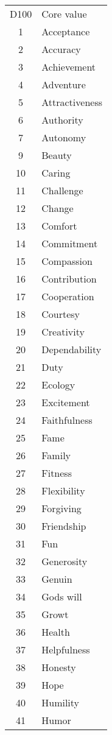 \documentclass[11pt,a4paper,twocolumn]{article}
\begin{document}
\begin{supertabular}{cl}
    D100 & Core value\\
    1 & Acceptance\\
    2 & Accuracy\\
    3 & Achievement\\
    4 & Adventure\\
    5 & Attractiveness\\
    6 & Authority\\
    7 & Autonomy\\
    9 & Beauty\\
    10 & Caring\\
    11 & Challenge\\
    12 & Change\\
    13 & Comfort\\
    14 & Commitment\\
    15 & Compassion\\
    16 & Contribution\\
    17 & Cooperation\\
    18 & Courtesy\\
    19 & Creativity\\
    20 & Dependability\\
    21 & Duty\\
    22 & Ecology\\
    23 & Excitement\\
    24 & Faithfulness\\
    25 & Fame\\
    26 & Family\\
    27 & Fitness\\
    28 & Flexibility\\
    29 & Forgiving\\
    30 & Friendship\\
    31 & Fun\\
    32 & Generosity\\
    33 & Genuin\\
    34 & Gods will\\
    35 & Growt\\
    36 & Health\\
    37 & Helpfulness\\
    38 & Honesty\\
    39 & Hope\\
    40 & Humility\\
    41 & Humor\\

\end{supertabular}
\end{document}
